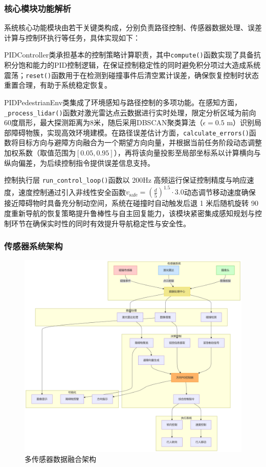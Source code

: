 \subsubsection{核心模块功能解析}

系统核心功能模块由若干关键类构成，分别负责路径控制、传感器数据处理、误差计算与控制环执行等任务，具体实现如下：

PIDController类承担基本的控制策略计算职责，其中\texttt{compute()}函数实现了具备抗积分饱和能力的PID控制逻辑，在保证控制稳定性的同时避免积分项过大造成系统震荡；\texttt{reset()}函数用于在检测到碰撞事件后清空累计误差，确保恢复控制时状态重置合理，有助于系统稳定恢复。

PIDPedestrianEnv类集成了环境感知与路径控制的多项功能。在感知方面，\texttt{\_process\_lidar()}函数对激光雷达点云数据进行实时处理，限定分析区域为前向60度扇形，最大探测距离为8米，随后采用DBSCAN聚类算法（$\epsilon=0.5$ m）识别局部障碍物簇，实现高效环境建模。在路径误差估计方面，\texttt{calculate\_errors()}函数将目标方向与避障方向融合为一个期望方向向量，并根据当前任务阶段动态调整加权系数（取值范围为$[0.05, 0.95]$），再将该向量投影至局部坐标系以计算横向与纵向偏差，为后续控制指令提供误差信息支持。

控制执行层 \texttt{run\_control\_loop()}函数以 200Hz 高频运行保证控制精度与响应速度，速度控制通过引入非线性安全函数$v_{\text{safe}} = (\frac{d}{5})^{1.5} \cdot 3.0$动态调节移动速度确保接近障碍物时具备充分制动空间，系统在碰撞时自动触发后退 1 米后随机旋转 90 度重新导航的恢复策略提升鲁棒性与自主回复能力，该模块紧密集成感知规划与控制环节在确保实时性的同时有效提升导航稳定性与安全性。

\subsubsection{传感器系统架构}
\begin{figure}[H]
    \centering
    \includegraphics[width=1\textwidth]{images/sensor_architecture.pdf}
    \caption{多传感器数据融合架构}
    \label{fig:sensor}
\end{figure}

